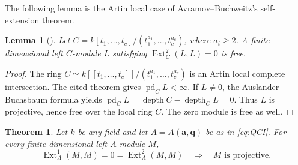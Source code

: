 \documentclass[11pt,a4paper]{article}
\numberwithin{equation}{section}
\theoremstyle{definition}
\theoremstyle{plain}
\newtheorem{theorem}[definition]{Theorem}
\newtheorem{lemma}[definition]{Lemma}
\theoremstyle{remark}
\DeclareMathOperator{\Ext}{Ext}
\DeclareMathOperator{\pd}{pd}
\DeclareMathOperator{\depth}{depth}
\begin{document}
The following lemma is the Artin local case of
Avramov--Buchweitz's self-extension theorem.

\begin{lemma}[{\cite[Theorem 4.2]{AB00}}]\label{lem:commutative}
Let \(C=k[t_1,\ldots,t_c]/(t_1^{a_1},\ldots,t_c^{a_c})\), where
\(a_i\geq2\). A finite-dimensional left \(C\)-module \(L\) satisfying
\(\Ext_C^2(L,L)=0\) is free.
\end{lemma}

\begin{proof}
The ring \(C\simeq k[[t_1,\ldots,t_c]]/(t_1^{a_1},\ldots,t_c^{a_c})\)
is an Artin local complete intersection. The cited theorem gives
\(\pd_C L<\infty\). If \(L\ne0\), the Auslander--Buchsbaum formula yields
\(\pd_C L=\depth C-\depth_C L=0\). Thus \(L\) is projective, hence free
over the local ring \(C\). The zero module is free as well.
\end{proof}

\begin{theorem}\label{thm:main}
Let \(k\) be any field and let \(A=A(\mathbf a,\mathbf q)\) be as in
\eqref{eq:QCI}. For every finite-dimensional left \(A\)-module \(M\),
\[
 \Ext_A^1(M,M)=0=\Ext_A^2(M,M)
 \quad\Longrightarrow\quad M\text{ is projective}.
\]
\end{theorem}
\end{document}
